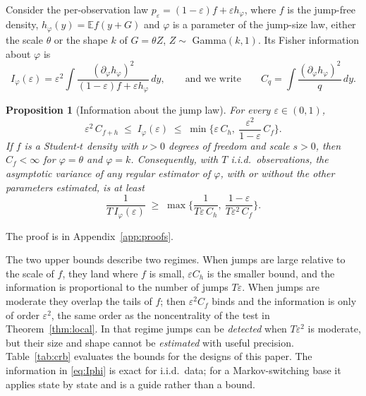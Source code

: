 \documentclass[11pt,a4paper]{article}
\newtheorem{proposition}{Proposition}
\theoremstyle{definition}
\theoremstyle{remark}
\newcommand{\E}{\mathbb{E}}
\begin{document}
Consider the per-observation law $p_\varepsilon=(1-\varepsilon)f+\varepsilon h_\varphi$, where $f$ is the jump-free density, $h_\varphi(y)=\E f(y+G)$ and $\varphi$ is a parameter of the jump-size law, either the scale $\theta$ or the shape $k$ of $G=\theta Z$, $Z\sim$ Gamma$(k,1)$. Its Fisher information about $\varphi$ is
\begin{equation}\label{eq:Iphi}
I_\varphi(\varepsilon)=\varepsilon^2\int\frac{(\partial_\varphi h_\varphi)^2}{(1-\varepsilon)f+\varepsilon h_\varphi}\,dy,
\qquad\text{and we write}\qquad C_q=\int\frac{(\partial_\varphi h_\varphi)^2}{q}\,dy .
\end{equation}

\begin{proposition}[Information about the jump law]\label{prop:jumpinfo}
For every $\varepsilon\in(0,1)$,
\[
\varepsilon^2\,C_{f+h}\;\le\;I_\varphi(\varepsilon)\;\le\;\min\Big\{\varepsilon\,C_h,\ \frac{\varepsilon^2}{1-\varepsilon}\,C_f\Big\}.
\]
If $f$ is a Student-$t$ density with $\nu>0$ degrees of freedom and scale $s>0$, then $C_f<\infty$ for $\varphi=\theta$ and $\varphi=k$. Consequently, with $T$ i.i.d.\ observations, the asymptotic variance of any regular estimator of $\varphi$, with or without the other parameters estimated, is at least
\[
\frac{1}{T\,I_\varphi(\varepsilon)}\;\ge\;\max\Big\{\frac{1}{T\varepsilon\,C_h},\ \frac{1-\varepsilon}{T\varepsilon^2\,C_f}\Big\}.
\]
\end{proposition}
\noindent The proof is in Appendix~\ref{app:proofs}.

\noindent The two upper bounds describe two regimes. When jumps are large relative to the scale of $f$, they land where $f$ is small, $\varepsilon C_h$ is the smaller bound, and the information is proportional to the number of jumps $T\varepsilon$. When jumps are moderate they overlap the tails of $f$; then $\varepsilon^2C_f$ binds and the information is only of order $\varepsilon^2$, the same order as the noncentrality of the test in Theorem~\ref{thm:local}. In that regime jumps can be \emph{detected} when $T\varepsilon^2$ is moderate, but their size and shape cannot be \emph{estimated} with useful precision. Table~\ref{tab:crb} evaluates the bounds for the designs of this paper. The information in \eqref{eq:Iphi} is exact for i.i.d.\ data; for a Markov-switching base it applies state by state and is a guide rather than a bound.
\end{document}
